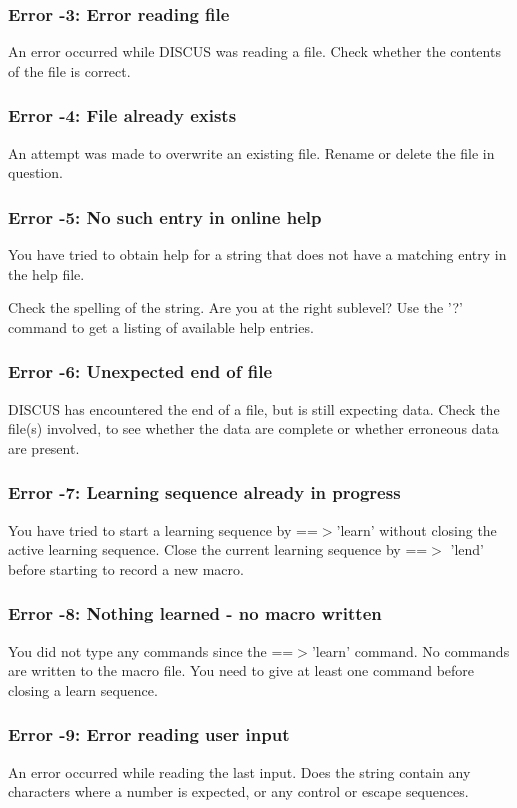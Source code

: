 \subsubsection{Error -3: Error reading file}
\par
An error occurred while  DISCUS was reading a file. Check whether the 
contents of the file is correct. 
\subsubsection{Error -4: File already exists}
\par
An attempt was made to overwrite an existing file. Rename or delete 
the file in question. 
\subsubsection{Error -5: No such entry in online help}
\par
You have tried to obtain help for a string that does not have a matching 
entry in the help file. 
\par
Check the spelling of the string. Are you at the right sublevel? 
Use the '?' command to get a listing of available help entries. 
\subsubsection{Error -6: Unexpected end of file}
\par
DISCUS has encountered the end of a file, but is still expecting data. 
Check the file(s) involved, to see whether the data are complete or 
whether erroneous data are present. 
\subsubsection{Error -7: Learning sequence already in progress}
\par
You have tried to start a learning sequence by ==$> $'learn' without 
closing the active learning sequence. Close the current learning 
sequence by ==$> $ 'lend' before starting to record a new macro. 
\subsubsection{Error -8: Nothing learned - no macro written}
\par
You did not type any commands since the ==$> $'learn' command. No commands 
are written to the macro file. 
You need to give at least one command before closing a learn sequence. 
\subsubsection{Error -9: Error reading user input}
\par
An error occurred while reading the last input. 
Does the string contain any characters where a number is expected, or 
any control or escape sequences. 
